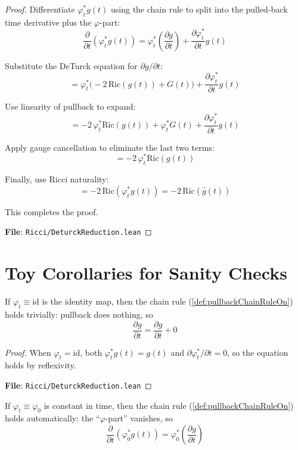 \begin{proof}
\leanok
Differentiate $\varphi_t^* g(t)$ using the chain rule to split into the pulled-back time derivative plus the $\varphi$-part:
\[ \frac{\partial}{\partial t}(\varphi_t^* g(t)) = \varphi_t^*\left(\frac{\partial g}{\partial t}\right) + \frac{\partial \varphi_t^*}{\partial t}g(t) \]

Substitute the DeTurck equation for $\partial g/\partial t$:
\[ = \varphi_t^*\big(-2\,\mathrm{Ric}(g(t)) + G(t)\big) + \frac{\partial \varphi_t^*}{\partial t}g(t) \]

Use linearity of pullback to expand:
\[ = -2\,\varphi_t^*\mathrm{Ric}(g(t)) + \varphi_t^* G(t) + \frac{\partial \varphi_t^*}{\partial t}g(t) \]

Apply gauge cancellation to eliminate the last two terms:
\[ = -2\,\varphi_t^*\mathrm{Ric}(g(t)) \]

Finally, use Ricci naturality:
\[ = -2\,\mathrm{Ric}(\varphi_t^* g(t)) = -2\,\mathrm{Ric}(\hat{g}(t)) \]

This completes the proof.

\textbf{File}: \texttt{Ricci/DeturckReduction.lean}
\end{proof}

\section{Toy Corollaries for Sanity Checks}

\begin{lemma}
\label{lem:pullbackChainRuleOn_id}
\leanok
{}
If $\varphi_t \equiv \mathrm{id}$ is the identity map, then the chain rule (\ref{def:pullbackChainRuleOn}) holds trivially: pullback does nothing, so
\[ \frac{\partial g}{\partial t} = \frac{\partial g}{\partial t} + 0 \]
\end{lemma}

\begin{proof}
\leanok
When $\varphi_t = \mathrm{id}$, both $\varphi_t^* g(t) = g(t)$ and $\partial \varphi_t^*/\partial t = 0$, so the equation holds by reflexivity.

\textbf{File}: \texttt{Ricci/DeturckReduction.lean}
\end{proof}

\begin{lemma}
\label{lem:pullbackChainRuleOn_constφ}
\leanok
{}
If $\varphi_t \equiv \varphi_0$ is constant in time, then the chain rule (\ref{def:pullbackChainRuleOn}) holds automatically: the ``$\varphi$-part'' vanishes, so
\[ \frac{\partial}{\partial t}(\varphi_0^* g(t)) = \varphi_0^*\left(\frac{\partial g}{\partial t}\right) \]
\end{lemma}

